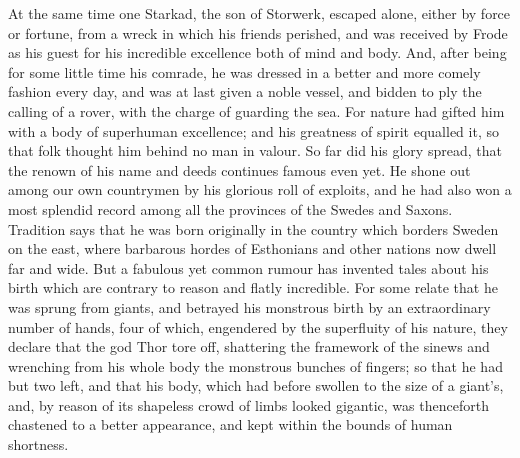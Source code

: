 \documentclass[10pt,a4paper]{report}
\begin{document}
At the same time one Starkad, the son of Storwerk, escaped alone, either by force or fortune, from a wreck in which his friends perished, and was received by Frode as his guest for his incredible excellence both of mind and body. And, after being for some little time his comrade, he was dressed in a better and more comely fashion every day, and was at last given a noble vessel, and bidden to ply the calling of a rover, with the charge of guarding the sea. For nature had gifted him with a body of superhuman excellence; and his greatness of spirit equalled it, so that folk thought him behind no man in valour. So far did his glory spread, that the renown of his name and deeds continues famous even yet. He shone out among our own countrymen by his glorious roll of exploits, and he had also won a most splendid record among all the provinces of the Swedes and Saxons. Tradition says that he was born originally in the country which borders Sweden on the east, where barbarous hordes of Esthonians and other nations now dwell far and wide. But a fabulous yet common rumour has invented tales about his birth which are contrary to reason and flatly incredible. For some relate that he was sprung from giants, and betrayed his monstrous birth by an extraordinary number of hands, four of which, engendered by the superfluity of his nature, they declare that the god Thor tore off, shattering the framework of the sinews and wrenching from his whole body the monstrous bunches of fingers; so that he had but two left, and that his body, which had before swollen to the size of a giant's, and, by reason of its shapeless crowd of limbs looked gigantic, was thenceforth chastened to a better appearance, and kept within the bounds of human shortness.\\
\end{document}
